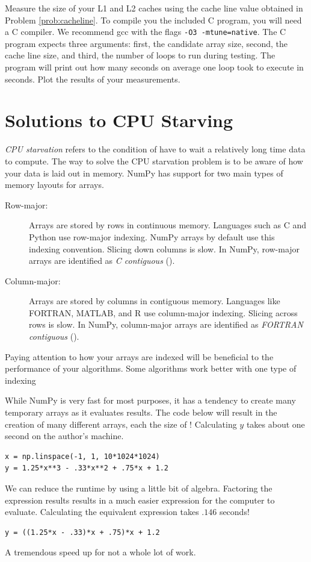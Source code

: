 \begin{problem}
Measure the size of your L1 and L2 caches using the cache line value obtained in
Problem \ref{prob:cacheline}.
To compile you the included C program, you will need a C compiler.
We recommend gcc with the flags \texttt{-O3 -mtune=native}.
The C program expects three arguments: first, the candidate array size, second, the cache line size, and third, the number of loops to run during testing.
The program will print out how many seconds on average one loop took to execute in seconds.
Plot the results of your measurements.
\end{problem}

\section*{Solutions to CPU Starving}
\emph{CPU starvation} refers to the condition of have to wait a relatively long time data to compute.
The way to solve the CPU starvation problem is to be aware of how your data is laid out in memory.
NumPy has support for two main types of memory layouts for arrays.
\begin{description}
\item[Row-major:] Arrays are stored by rows in continuous memory.
Languages such as C and Python use row-major indexing.  NumPy arrays by default use this indexing convention.
Slicing down columns is slow.  In NumPy, row-major arrays are identified as \emph{C contiguous} ().
\item[Column-major:] Arrays are stored by columns in contiguous memory.
Languages like FORTRAN, MATLAB, and R use column-major indexing.  Slicing across rows is slow.
In NumPy, column-major arrays are identified as \emph{FORTRAN contiguous} ().
\end{description}
Paying attention to how your arrays are indexed will be beneficial to the performance of your algorithms.
Some algorithms work better with one type of indexing

While NumPy is very fast for most purposes, it has a tendency to create many temporary arrays as it evaluates results.
The code below will result in the creation of many different arrays, each the size of !
Calculating $y$ takes about one second on the author's machine.
\begin{lstlisting}
x = np.linspace(-1, 1, 10*1024*1024)
y = 1.25*x**3 - .33*x**2 + .75*x + 1.2
\end{lstlisting}
We can reduce the runtime by using a little bit of algebra.
Factoring the expression results results in a much easier expression for the computer to evaluate.
Calculating the equivalent expression takes $.146$ seconds!
\begin{lstlisting}
y = ((1.25*x - .33)*x + .75)*x + 1.2
\end{lstlisting}
A tremendous speed up for not a whole lot of work.


